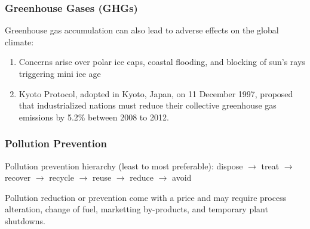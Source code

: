 \documentclass[12pt, a4paper]{article}
\begin{document}
\begin{multicols*}{3}
\subsubsection{Greenhouse Gases (GHGs)}

Greenhouse gas accumulation can also lead to adverse effects on the global climate:
\begin{enumerate}[\roman*.]
  \item Concerns arise over polar ice caps, coastal flooding, and blocking of sun's rays triggering mini ice age
  \item Kyoto Protocol, adopted in Kyoto, Japan, on 11 December 1997, proposed that industrialized nations must reduce their collective greenhouse gas emissions by 5.2\% between 2008 to 2012.
\end{enumerate}

\colbreak
\subsubsection{Pollution Prevention}
Pollution prevention hierarchy (least to most preferable): dispose $\rightarrow$ treat $\rightarrow$ recover $\rightarrow$ recycle $\rightarrow$ reuse $\rightarrow$ reduce $\rightarrow$ avoid

Pollution reduction or prevention come with a price and may require process alteration, change of fuel, marketting by-products, and temporary plant shutdowns.



\end{multicols*}
\end{document}
